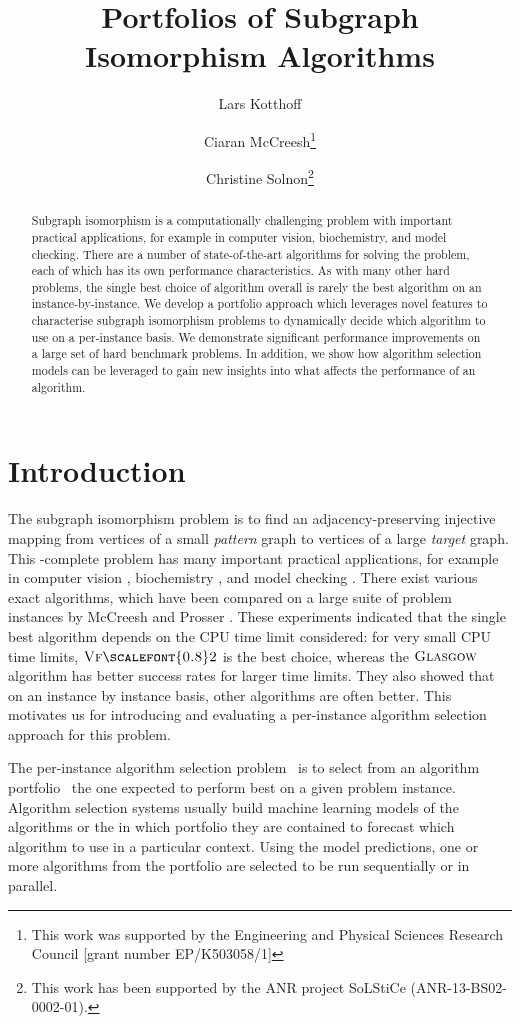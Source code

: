 \documentclass{llncs}
\title{Portfolios of Subgraph Isomorphism Algorithms}
\author{
    Lars Kotthoff\inst{1}
    \and Ciaran McCreesh\thanks{This work was supported by the Engineering
        and Physical Sciences Research Council [grant number EP/K503058/1]}\inst{2}
    \and Christine Solnon\thanks{This work has been supported by the ANR project SoLStiCe (ANR-13-BS02-0002-01).}\inst{3}}
\institute{
    University of British Columbia, Vancouver, Canada
    \and University of Glasgow, Glasgow, Scotland
    \and INSA-Lyon, LIRIS, UMR5205, F-69621, France}
\newcommand{\VFtwo}{$\textsc{Vf{\scalefont{0.8}2}}$\xspace}
\newcommand{\Glasgow}{$\textsc{Glasgow}$\xspace}
\begin{document}
\maketitle

\begin{abstract}
Subgraph isomorphism is a computationally challenging problem with important practical
applications, for example in computer vision, biochemistry, and model checking. There are a number
of state-of-the-art algorithms for solving the problem, each of which has its own performance
characteristics. As with many other hard problems, the single best choice of algorithm overall is
rarely the best algorithm on an instance-by-instance. We develop a portfolio approach which leverages
novel features to characterise subgraph isomorphism problems to dynamically decide which algorithm
to use on a per-instance basis. We demonstrate significant performance improvements on a large set
of hard benchmark problems. In addition, we show how algorithm selection models can be leveraged to
gain new insights into what affects the performance of an algorithm.
\end{abstract}

\section{Introduction}

The subgraph isomorphism problem is to find an adjacency-preserving injective mapping from vertices
of a small \emph{pattern} graph to vertices of a large \emph{target} graph. This \NP-complete
problem has many important practical applications, for example in computer vision
\cite{cviu11,pr15}, biochemistry \cite{Giugno:2013}, and model checking \cite{Sevegnani:2015}. There
exist various exact algorithms, which have been compared on a large suite of problem instances by
McCreesh and Prosser \cite{McCreesh:2015}. These experiments indicated that the single best
algorithm depends on the CPU time limit considered: for very small CPU time limits, \VFtwo
\cite{Cordella:2004} is the best choice, whereas the \Glasgow algorithm \cite{McCreesh:2015} has
better success rates for larger time limits.  They also showed that on an instance by instance
basis, other algorithms are often better. This motivates us for introducing and evaluating a per-instance algorithm selection  approach for this problem.


The per-instance algorithm selection problem~\cite{rice_algorithm_1976} is to select from an
algorithm portfolio~\cite{huberman_economics_1997,gomes_algorithm_2001} the one expected to perform
best on a given problem instance. Algorithm selection systems usually build machine learning models
of the algorithms or the in which portfolio they are contained to forecast which algorithm to use in a
particular context. Using the model predictions, one or more algorithms from the portfolio are
selected to be run sequentially or in parallel.
\end{document}
